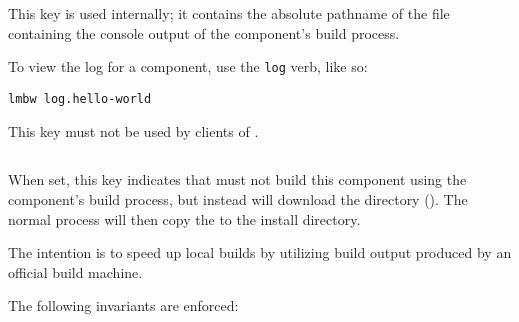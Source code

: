 This key is used internally; it contains the absolute pathname of the
file containing the console output of the component's build process.

To view the log for a component, use the \texttt{log} verb, like so:

\begin{verbatim}
lmbw log.hello-world
\end{verbatim}

This key must not be used by clients of \lmsbw.


\subsection{}
\label{variables:build-output-download}

When set, this key indicates that \lmsbw must not build this component
using the component's build process, but instead will download the
\destdir directory ().  The normal
\lmsbw process will then copy the \destdir to the install directory.

The intention is to speed up local builds by utilizing build output
produced by an official build machine.

The following invariants are enforced:

